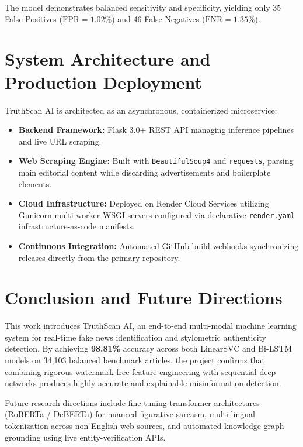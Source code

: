 \documentclass[11pt,a4paper]{article}
\begin{document}
The model demonstrates balanced sensitivity and specificity, yielding only 35 False Positives ($\text{FPR} = 1.02\%$) and 46 False Negatives ($\text{FNR} = 1.35\%$).

\section{System Architecture and Production Deployment}
TruthScan AI is architected as an asynchronous, containerized microservice:
\begin{itemize}[leftmargin=*]
    \item \textbf{Backend Framework:} Flask 3.0+ REST API managing inference pipelines and live URL scraping.
    \item \textbf{Web Scraping Engine:} Built with \texttt{BeautifulSoup4} and \texttt{requests}, parsing main editorial content while discarding advertisements and boilerplate elements.
    \item \textbf{Cloud Infrastructure:} Deployed on Render Cloud Services utilizing Gunicorn multi-worker WSGI servers configured via declarative \texttt{render.yaml} infrastructure-as-code manifests.
    \item \textbf{Continuous Integration:} Automated GitHub build webhooks synchronizing releases directly from the primary repository.
\end{itemize}

\section{Conclusion and Future Directions}
This work introduces TruthScan AI, an end-to-end multi-modal machine learning system for real-time fake news identification and stylometric authenticity detection. By achieving \textbf{98.81\%} accuracy across both LinearSVC and Bi-LSTM models on 34,103 balanced benchmark articles, the project confirms that combining rigorous watermark-free feature engineering with sequential deep networks produces highly accurate and explainable misinformation detection.

Future research directions include fine-tuning transformer architectures (RoBERTa / DeBERTa) for nuanced figurative sarcasm, multi-lingual tokenization across non-English web sources, and automated knowledge-graph grounding using live entity-verification APIs.
\end{document}
